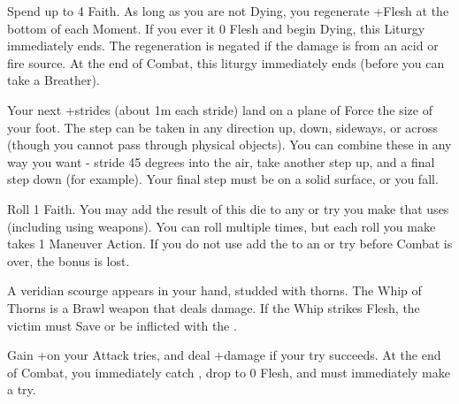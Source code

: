 \begin{multicols*}{2}
\LITURGY [
  Name = Trollblood,
  Link = arcana-mystery-trollblood,
  Paradigm = J{\UmlautO}tnar,
  Duration=2 Maneuver Actions
]

Spend up to 4 Faith. As long as you are not Dying, you regenerate +\DICE Flesh at the bottom of each Moment. If you ever it 0 Flesh and begin Dying, this Liturgy immediately ends. The regeneration is negated if the damage is from an acid or fire source. At the end of Combat, this liturgy immediately ends (before you can take a Breather).


\LITURGY [
  Name = Vaulting Step,
  Link = arcana-mystery-vaulting-step,
  Paradigm = Errant,
  Duration=1 Maneuver Action
]

Your next \DICE+\DICE strides (about 1m each stride) land on a plane of Force the size of your foot.  The step can be taken in any direction up, down, sideways, or across (though you cannot pass through physical objects).  You can combine these in any way you want - stride 45 degrees into the air, take another step up, and a final step down (for example).  Your final step must be on a solid surface, or you fall.

\LITURGY [
  Name = Vulpine Wisdom,
  Link = arcana-mystery-vulpine-wisdom,
  Paradigm = Cunning,
  Duration=1 Maneuver Action
]

Roll 1 Faith. You may add the result of this die to any \RO or \RB try you make that uses \INT (including using \INT weapons). You can roll multiple times, but each roll you make takes 1 Maneuver Action. If you do not use add the \SUMDICE to an \RO or \RB try before Combat is over, the bonus is lost.


\LITURGY [
  Name = Whip of Thorns,
  Link = arcana-mystery-whip-of-thorns,
  Paradigm = Heathen,
  Duration=1 Maneuver Action
]

A veridian scourge appears in your hand, studded with thorns. The Whip of Thorns is a \FOC Brawl weapon that deals \DICE damage. If the Whip strikes Flesh, the victim must Save or be inflicted with the .

\LITURGY [
  Name = Witness Me,
  Link = arcana-mystery-witness-me,
  Paradigm = J{\UmlautO}tnar,
  Duration=1 Maneuver Action
]

Gain +\DICE on your Attack tries, and deal +\DICE damage if your try succeeds.  At the end of Combat, you immediately catch , drop to 0 Flesh, and must immediately make a \DEATH try.




\end{multicols*}
